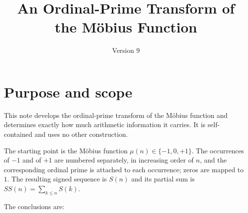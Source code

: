 \documentclass[11pt]{amsart}
\title{An Ordinal-Prime Transform of the M\"obius Function}
\author{}
\date{Version 9}
\numberwithin{equation}{section}
\theoremstyle{plain}
\theoremstyle{definition}
\theoremstyle{remark}
\newcommand{\mob}{\mu}
\begin{document}
\maketitle
\tableofcontents

\section{Purpose and scope}
\label{sec:purpose}

This note develops the ordinal-prime transform of the M\"obius function and
determines exactly how much arithmetic information it carries. It is
self-contained and uses no other construction.

The starting point is the M\"obius function $\mob(n)\in\{-1,0,+1\}$. The
occurrences of $-1$ and of $+1$ are numbered separately, in increasing order of
$n$, and the corresponding ordinal prime is attached to each occurrence; zeros
are mapped to $1$. The resulting signed sequence is $S(n)$ and its partial sum
is $SS(n)=\sum_{k\le n}S(k)$.

The conclusions are:
\end{document}
